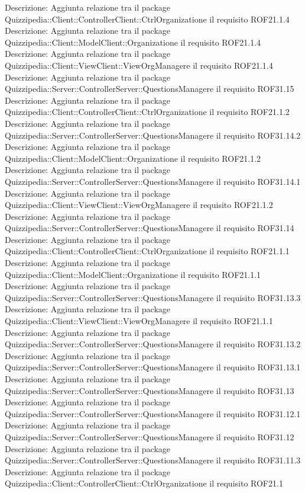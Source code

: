 Descrizione: Aggiunta relazione tra il package Quizzipedia::Client::ControllerClient::CtrlOrganizatione il requisito ROF21.1.4 
Descrizione: Aggiunta relazione tra il package Quizzipedia::Client::ModelClient::Organizatione il requisito ROF21.1.4 
Descrizione: Aggiunta relazione tra il package Quizzipedia::Client::ViewClient::ViewOrgManagere il requisito ROF21.1.4 
Descrizione: Aggiunta relazione tra il package Quizzipedia::Server::ControllerServer::QuestionsManagere il requisito ROF31.15 
Descrizione: Aggiunta relazione tra il package Quizzipedia::Client::ControllerClient::CtrlOrganizatione il requisito ROF21.1.2 
Descrizione: Aggiunta relazione tra il package Quizzipedia::Server::ControllerServer::QuestionsManagere il requisito ROF31.14.2 
Descrizione: Aggiunta relazione tra il package Quizzipedia::Client::ModelClient::Organizatione il requisito ROF21.1.2 
Descrizione: Aggiunta relazione tra il package Quizzipedia::Server::ControllerServer::QuestionsManagere il requisito ROF31.14.1 
Descrizione: Aggiunta relazione tra il package Quizzipedia::Client::ViewClient::ViewOrgManagere il requisito ROF21.1.2 
Descrizione: Aggiunta relazione tra il package Quizzipedia::Server::ControllerServer::QuestionsManagere il requisito ROF31.14 
Descrizione: Aggiunta relazione tra il package Quizzipedia::Client::ControllerClient::CtrlOrganizatione il requisito ROF21.1.1 
Descrizione: Aggiunta relazione tra il package Quizzipedia::Client::ModelClient::Organizatione il requisito ROF21.1.1 
Descrizione: Aggiunta relazione tra il package Quizzipedia::Server::ControllerServer::QuestionsManagere il requisito ROF31.13.3 
Descrizione: Aggiunta relazione tra il package Quizzipedia::Client::ViewClient::ViewOrgManagere il requisito ROF21.1.1 
Descrizione: Aggiunta relazione tra il package Quizzipedia::Server::ControllerServer::QuestionsManagere il requisito ROF31.13.2 
Descrizione: Aggiunta relazione tra il package Quizzipedia::Server::ControllerServer::QuestionsManagere il requisito ROF31.13.1 
Descrizione: Aggiunta relazione tra il package Quizzipedia::Server::ControllerServer::QuestionsManagere il requisito ROF31.13 
Descrizione: Aggiunta relazione tra il package Quizzipedia::Server::ControllerServer::QuestionsManagere il requisito ROF31.12.1 
Descrizione: Aggiunta relazione tra il package Quizzipedia::Server::ControllerServer::QuestionsManagere il requisito ROF31.12 
Descrizione: Aggiunta relazione tra il package Quizzipedia::Server::ControllerServer::QuestionsManagere il requisito ROF31.11.3 
Descrizione: Aggiunta relazione tra il package Quizzipedia::Client::ControllerClient::CtrlOrganizatione il requisito ROF21.1 

